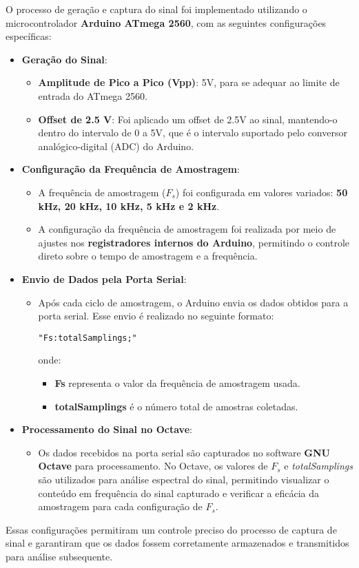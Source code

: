O processo de geração e captura do sinal foi implementado utilizando o microcontrolador \textbf{Arduino ATmega 2560}, com as seguintes configurações específicas:

\begin{itemize}
    \item \textbf{Geração do Sinal}:
        \begin{itemize}
            \item \textbf{Amplitude de Pico a Pico (Vpp)}: 5V, para se adequar ao limite de entrada do ATmega 2560.
            \item \textbf{Offset de 2.5 V}: Foi aplicado um offset de 2.5V ao sinal, mantendo-o dentro do intervalo de 0 a 5V, que é o intervalo suportado pelo conversor analógico-digital (ADC) do Arduino.
        \end{itemize}
    
    \item \textbf{Configuração da Frequência de Amostragem}:
        \begin{itemize}
            \item A frequência de amostragem ($F_s$) foi configurada em valores variados: \textbf{50 kHz, 20 kHz, 10 kHz, 5 kHz e 2 kHz}.
            \item A configuração da frequência de amostragem foi realizada por meio de ajustes nos \textbf{registradores internos do Arduino}, permitindo o controle direto sobre o tempo de amostragem e a frequência.
        \end{itemize}

    \item \textbf{Envio de Dados pela Porta Serial}:
        \begin{itemize}
            \item Após cada ciclo de amostragem, o Arduino envia os dados obtidos para a porta serial. Esse envio é realizado no seguinte formato:
            \begin{center}
                \texttt{"Fs:totalSamplings;"}
            \end{center}
            onde:
            \begin{itemize}
                \item \textbf{Fs} representa o valor da frequência de amostragem usada.
                \item \textbf{totalSamplings} é o número total de amostras coletadas.
            \end{itemize}
        \end{itemize}
    
    \item \textbf{Processamento do Sinal no Octave}:
        \begin{itemize}
            \item Os dados recebidos na porta serial são capturados no software \textbf{GNU Octave} para processamento. No Octave, os valores de $F_s$ e \textit{totalSamplings} são utilizados para análise espectral do sinal, permitindo visualizar o conteúdo em frequência do sinal capturado e verificar a eficácia da amostragem para cada configuração de $F_s$.
        \end{itemize}
\end{itemize}

Essas configurações permitiram um controle preciso do processo de captura de sinal e garantiram que os dados fossem corretamente armazenados e transmitidos para análise subsequente.
